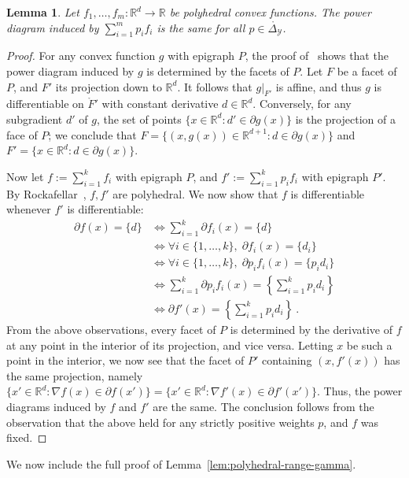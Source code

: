 \documentclass[11pt]{article}
\newcommand{\reals}{\mathbb{R}}
\newcommand{\simplex}{\Delta_\Y}
\newcommand{\Y}{\mathcal{Y}}
\newcommand{\inter}[1]{\mathring{#1}}%
\newtheorem{lemma}{Lemma}
\begin{document}
\begin{lemma}\label{lem:polyhedral-pd-same}
	Let $f_1,\ldots,f_m:\reals^d\to\reals$ be polyhedral convex functions.
	The power diagram induced by $\sum_{i=1}^m p_i f_i$ is the same for all $p \in \inter\simplex$.
\end{lemma}
\begin{proof}
	For any convex function $g$ with epigraph $P$, the proof of~\citet[Theorem 4]{aurenhammer1987power} shows that the power diagram induced by $g$ is determined by the facets of $P$.
	Let $F$ be a facet of $P$, and $F'$ its projection down to $\reals^d$.
	It follows that $g|_{F'}$ is affine, and thus $g$ is differentiable on $\inter F'$ with constant derivative $d\in\reals^d$.
	Conversely, for any subgradient $d'$ of $g$, the set of points $\{x\in\reals^d : d'\in\partial g(x)\}$ is the projection of a face of $P$; we conclude that $F = \{(x,g(x))\in\reals^{d+1} : d\in\partial g(x)\}$ and $F' = \{x\in\reals^d : d\in\partial g(x)\}$.
	
	Now let $f := \sum_{i=1}^k f_i$ with epigraph $P$, and $f' := \sum_{i=1}^k p_i f_i$ with epigraph $P'$.
	By Rockafellar~\cite{rockafellar1997convex}, $f,f'$ are polyhedral.
	We now show that $f$ is differentiable whenever $f'$ is differentiable:
	\begin{align*}
	\partial f(x) = \{d\}
	&\iff \sum_{i=1}^k \partial f_i(x) = \{d\} \\
	&\iff \forall i\in\{1,\ldots,k\}, \; \partial f_i(x) = \{d_i\} \\
	&\iff \forall i\in\{1,\ldots,k\}, \; \partial p_i f_i(x) = \{p_id_i\} \\
	&\iff \sum_{i=1}^k \partial p_if_i(x) = \left\{\sum_{i=1}^k p_id_i\right\} \\
	&\iff \partial f'(x) = \left\{\sum_{i=1}^k p_id_i\right\}~.
	\end{align*}
	From the above observations, every facet of $P$ is determined by the derivative of $f$ at any point in the interior of its projection, and vice versa.
	Letting $x$ be such a point in the interior, we now see that the facet of $P'$ containing $(x,f'(x))$ has the same projection, namely $\{x'\in\reals^d : \nabla f(x) \in \partial f(x')\} = \{x'\in\reals^d : \nabla f'(x) \in \partial f'(x')\}$.
	Thus, the power diagrams induced by $f$ and $f'$ are the same.
	The conclusion follows from the observation that the above held for any strictly positive weights $p$, and $f$ was fixed.
\end{proof}

We now include the full proof of Lemma~\ref{lem:polyhedral-range-gamma}.
\end{document}
